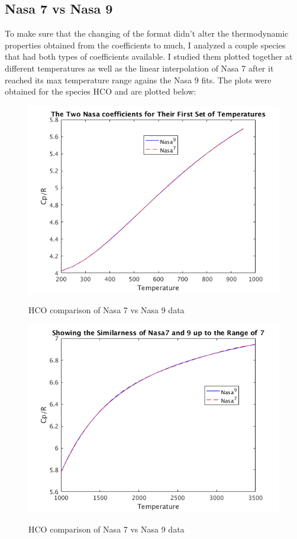 \documentclass{article}
\begin{document}
\subsection{Nasa 7 vs Nasa 9}
To make sure that the changing of the format didn't alter the thermodynamic properties obtained from the coefficients to much, I analyzed a couple species that had both types of coefficients available. I studied them plotted together at different temperatures as well as the linear interpolation of Nasa 7 after it reached its max temperature range agains the Nasa 9 fits. The plots were obtained for the species HCO and are plotted below:
\begin{figure}
  \centering
  \includegraphics[width=.8\linewidth]{./NasaPlots/Cp1.png}
  \label{fig:cp1}
  \caption{HCO comparison of Nasa 7 vs Nasa 9 data}
\end{figure}



\begin{figure}
  \centering
  \includegraphics[width=.8\linewidth]{./NasaPlots/Cp2.png}
  \label{fig:cp2}
  \caption{HCO comparison of Nasa 7 vs Nasa 9 data}
\end{figure}
\end{document}
